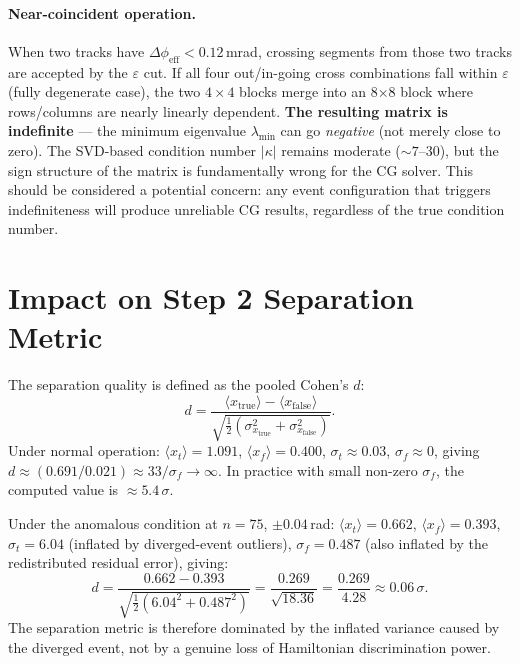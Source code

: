 \documentclass[12pt,a4paper]{article}
\newcommand{\eps}{\varepsilon}
\begin{document}
\paragraph{Near-coincident operation.}
When two tracks have $\Delta\phi_\text{eff} < 0.12$\,mrad, crossing segments
from those two tracks are accepted by the $\eps$ cut.
If all four out/in-going cross combinations fall within $\eps$
(fully degenerate case), the two $4\times4$ blocks merge into an 8$\times8$
block where rows/columns are nearly linearly dependent.
\textbf{The resulting matrix is indefinite} — the minimum eigenvalue
$\lambda_\text{min}$ can go \emph{negative} (not merely close to zero).
The SVD-based condition number $|\kappa|$ remains moderate ($\sim 7\text{--}30$),
but the sign structure of the matrix is fundamentally wrong for the CG solver.
This should be considered a potential concern: any event configuration
that triggers indefiniteness will produce unreliable CG results,
regardless of the true condition number.

\section{Impact on Step 2 Separation Metric}
\label{sec:separation}

The separation quality is defined as the pooled Cohen's $d$:
\begin{equation}
  d = \frac{\langle x_\text{true}\rangle - \langle x_\text{false}\rangle}
      {\sqrt{\frac{1}{2}\!
             \left(\sigma_{x_\text{true}}^2 + \sigma_{x_\text{false}}^2\right)}}.
  \label{eq:cohend}
\end{equation}
Under normal operation:
$\langle x_t\rangle = 1.091$, $\langle x_f\rangle = 0.400$,
$\sigma_t \approx 0.03$, $\sigma_f \approx 0$,
giving $d \approx (0.691/0.021) \approx 33/\sigma_f\to\infty$.
In practice with small non-zero $\sigma_f$, the computed value is $\approx 5.4\,\sigma$.

Under the anomalous condition at $n=75$, $\pm0.04$\,rad:
$\langle x_t\rangle = 0.662$, $\langle x_f\rangle = 0.393$,
$\sigma_t = 6.04$ (inflated by diverged-event outliers),
$\sigma_f = 0.487$ (also inflated by the redistributed residual error),
giving:
\begin{equation*}
  d = \frac{0.662 - 0.393}{\sqrt{\frac{1}{2}(6.04^2 + 0.487^2)}}
    = \frac{0.269}{\sqrt{18.36}}
    = \frac{0.269}{4.28} \approx 0.06\,\sigma.
\end{equation*}
The separation metric is therefore dominated by the inflated variance
caused by the diverged event, not by a genuine loss of Hamiltonian discrimination
power.
\end{document}
